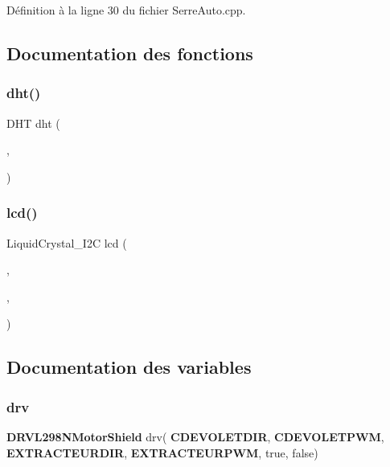 Définition à la ligne 30 du fichier Serre\+Auto.\+cpp.



\subsection{Documentation des fonctions}
\mbox{\label{_serre_auto_8cpp_ad7a1df263f6f823242a112ec11297434}} 
\subsubsection{dht()}
{\footnotesize\ttfamily D\+HT dht (\begin{DoxyParamCaption}\item[{\textbf{ D\+H\+T\+P\+IN}}]{,  }\item[{\textbf{ D\+H\+T\+T\+Y\+PE}}]{ }\end{DoxyParamCaption})}

\mbox{\label{_serre_auto_8cpp_ae084e1bc8ccb35ea289ba0ca4972ea6d}} 
\subsubsection{lcd()}
{\footnotesize\ttfamily Liquid\+Crystal\+\_\+\+I2C lcd (\begin{DoxyParamCaption}\item[{0x27}]{,  }\item[{16}]{,  }\item[{2}]{ }\end{DoxyParamCaption})}



\subsection{Documentation des variables}
\mbox{\label{_serre_auto_8cpp_a1ff10cd00601bd7f6028d08ff6e33a81}} 
\subsubsection{drv}
{\footnotesize\ttfamily \textbf{ D\+R\+V\+L298\+N\+Motor\+Shield} drv(\textbf{ C\+D\+E\+V\+O\+L\+E\+T\+D\+IR}, \textbf{ C\+D\+E\+V\+O\+L\+E\+T\+P\+WM}, \textbf{ E\+X\+T\+R\+A\+C\+T\+E\+U\+R\+D\+IR}, \textbf{ E\+X\+T\+R\+A\+C\+T\+E\+U\+R\+P\+WM}, true, false)}

